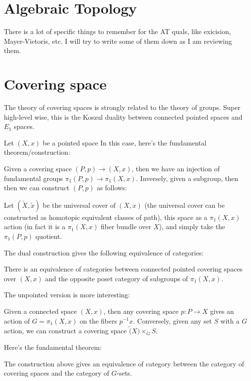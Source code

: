 \documentclass[main.tex]{subfiles}
\begin{document}
\section{Algebraic Topology}
There is a lot of specific things to remember for the AT quals, like exicision, Mayer-Vietoris, etc. I will try to write some of them down as I am reviewing them.

\section{Covering space}
The theory of covering spaces is strongly related to the theory of groups. Super high-level wise, this is the Koszul duality between connected pointed spaces and $E_1$ spaces.

Let $(X,x)$ be a pointed space
In this case, here's the fundamental theorem/construction:

\begin{construction}
Given a covering space $(P, p) \rightarrow (X,x)$, then we have an injection of fundamental groups $\pi_1 (P, p) \rightarrow \pi_1 (X,x)$. Inversely, given a subgroup, then then we can construct $(P, p)$ as follows:

Let $(\tilde{X}, \tilde{x})$ be the universal cover of $(X,x)$ (the universal cover can be constructed as homotopic equivalent classes of path), this space as a $\pi_1(X,x)$ action (in fact it is a $\pi_1(X,x)$ fiber bundle over $X$), and simply take the $\pi_1(P, p)$ quotient.
\end{construction}

The dual construction gives the following equivalence of categories:
\begin{theorem}
There is an equivalence of categories between connected pointed covering spaces over $(X, x)$ and the opposite poset category of subgroups of $\pi_1(X,x)$.
\end{theorem}

The unpointed version is more interesting:
\begin{construction}
Given a connected space $(X,x)$, then any covering space $p: P \rightarrow X$ gives an action of $G = \pi_1(X,x)$ on the fibers $p^{-1} x$. Conversely, given any set $S$ with a $G$ action, we can construct a covering space $\tilde(X) \times_G S$. 
\end{construction}

Here's the fundamental theorem:
\begin{theorem}
The construction above gives an equivalence of category between the category of covering spaces and the category of $G$-sets.
\end{theorem}
\end{document}
